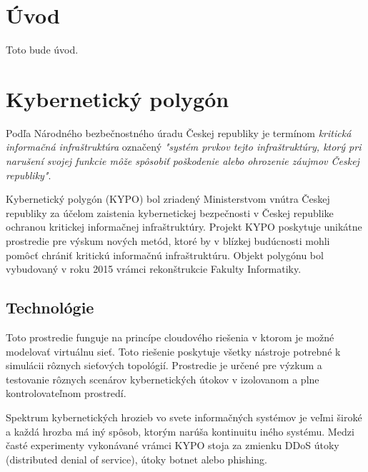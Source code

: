 \documentclass[
  digital, %
  twoside, %
  notable,   %
  nolof,   %
  nolot,   %
]{fithesis3}
\begin{document}
\chapter*{Úvod}
Toto bude úvod.

\chapter{Kybernetický polygón}
Podľa Národného bezbečnostného úradu Českej republiky je termínom \textit{kritická informačná infraštruktúra} označený \textit{"systém prvkov tejto infraštruktúry, ktorý pri narušení svojej funkcie môže spôsobiť poškodenie alebo ohrozenie záujmov Českej republiky"}\cite{nbu2012}.

Kybernetický polygón (KYPO) bol zriadený Ministerstvom vnútra Českej republiky za účelom zaistenia kybernetickej bezpečnosti v Českej republike ochranou kritickej informačnej infraštruktúry. Projekt KYPO poskytuje unikátne prostredie pre výskum nových metód, ktoré by v blízkej budúcnosti mohli pomôcť chrániť kritickú informačnú infraštruktúru\cite{dankovvcikova2015konfigurace}. Objekt polygónu bol vybudovaný v roku 2015 vrámci rekonštrukcie Fakulty Informatiky.

\section{Technológie}
Toto prostredie funguje na princípe cloudového riešenia v ktorom je možné modelovať virtuálnu sieť\cite{eichler2014analytical}. Toto riešenie poskytuje všetky nástroje potrebné k simulácii rôznych sieťových topológií. Prostredie je určené pre výzkum a testovanie rôznych scenárov kybernetických útokov v izolovanom a plne kontrolovateľnom prostredí\cite{vceleda2015kypo}.

Spektrum kybernetických hrozieb vo svete informačných systémov je veľmi široké a každá hrozba má iný spôsob, ktorým narúša kontinuitu iného systému. Medzi časté experimenty vykonávané vrámci KYPO stoja za zmienku DDoS útoky (distributed denial of service), útoky botnet alebo phishing\cite{vcegan2014navrh, celeda2013projekt}.
\end{document}
